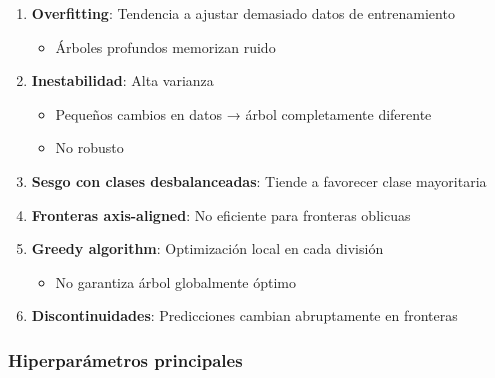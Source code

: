 \documentclass[
  doc,
  floatsintext,
  longtable,
  a4paper,
  nolmodern,
  notxfonts,
  notimes,
  12pt,
  colorlinks=true,linkcolor=blue,citecolor=blue,urlcolor=blue]{apa7}
\providecommand{\tightlist}{%
  \setlength{\itemsep}{0pt}\setlength{\parskip}{0pt}}
\begin{document}
\begin{enumerate}
\def\labelenumi{\arabic{enumi}.}
\item
  \textbf{Overfitting}: Tendencia a ajustar demasiado datos de
  entrenamiento

  \begin{itemize}
  \tightlist
  \item
    Árboles profundos memorizan ruido
  \end{itemize}
\item
  \textbf{Inestabilidad}: Alta varianza

  \begin{itemize}
  \tightlist
  \item
    Pequeños cambios en datos → árbol completamente diferente
  \item
    No robusto
  \end{itemize}
\item
  \textbf{Sesgo con clases desbalanceadas}: Tiende a favorecer clase
  mayoritaria
\item
  \textbf{Fronteras axis-aligned}: No eficiente para fronteras oblicuas
\item
  \textbf{Greedy algorithm}: Optimización local en cada división

  \begin{itemize}
  \tightlist
  \item
    No garantiza árbol globalmente óptimo
  \end{itemize}
\item
  \textbf{Discontinuidades}: Predicciones cambian abruptamente en
  fronteras
\end{enumerate}

\subsubsection{Hiperparámetros
principales}\label{hiperparuxe1metros-principales}
\end{document}

